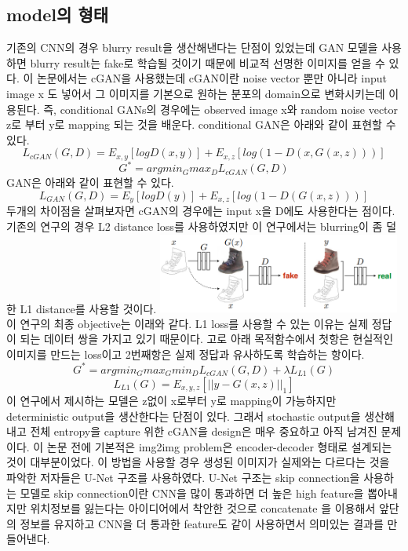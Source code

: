 \documentclass[extendedabs]{bmvc2k}
\begin{document}
 \subsection{model의 형태\cite{youtube}}
 \quad 기존의 CNN의 경우 blurry result을 생산해낸다는 단점이 있었는데 GAN 모델을 사용하면 blurry result는 fake로 학습될 것이기 때문에 비교적 선명한 이미지를 얻을 수 있다.  
 이 논문에서는 cGAN을 사용했는데 cGAN이란 noise vector 뿐만 아니라 input image x 도 넣어서 그 이미지를 기본으로 원하는 분포의 domain으로 변화시키는데 이용된다. 즉, 
 conditional GANs의 경우에는 observed image x와 random noise vector z로 부터 y로 mapping 되는 것을 배운다.
 conditional GAN은 아래와 같이 표현할 수 있다.
 $$ L_{cGAN}(G,D) = E_{x,y} [ log D(x,y) ] + E_{x,z} [log(1-D(x,G(x,z)))]$$
 $$G^* = argmin_G max_D L_{cGAN}(G,D) $$
 GAN은 아래와 같이 표현할 수 있다.
 $$ L_{GAN}(G,D) = E_y[log D(y)] + E_{x,z}[log(1-D(G(x,z)))]$$
 두개의 차이점을 살펴보자면 cGAN의 경우에는 input x을 D에도 사용한다는 점이다.
 기존의 연구의 경우 L2 distance loss를 사용하였지만 이 연구에서는 blurring이 좀 덜한 L1 distance를 사용할 것이다. 
 \newline  \includegraphics[width=8cm]{images/00_pix2pix.PNG}
 \newline 이 연구의 최종  objective는 이래와 같다. L1 loss를 사용할 수 있는 이유는 실제 정답이 되는 데이터 쌍을 가지고 있기 때문이다.
 고로 아래 목적함수에서 첫항은 현실적인 이미지를 만드는 loss이고 2번째항은 실제 정답과 유사하도록 학습하는 항이다.
 $$ G^{*} = argmin_G max_G min_D L_{cGAN}(G,D) + \lambda L_{L1}(G)$$
 $$ L_{L1}(G) = E_{x,y,z}[||y-G(x,z)||_1] $$
 이 연구에서 제시하는 모델은 z없이 x로부터 y로 mapping이 가능하지만 deterministic output을 생산한다는 단점이 있다.
 그래서 stochastic output을 생산해내고 전체 entropy을 capture 위한 cGAN을 design은 매우 중요하고 아직 남겨진 문제이다.
 이 논문 전에 기본적은 img2img problem은 encoder-decoder 형태로 설계되는 것이 대부분이었다. 이 방법을 사용할 경우 생성된 이미지가 
 실제와는 다르다는 것을 파악한 저자들은 U-Net 구조를 사용하였다. U-Net 구조는 skip connection을 사용하는 모델로 skip connection이란
 CNN을 많이 통과하면 더 높은 high feature을 뽑아내지만 위치정보를 잃는다는 아이디어에서 착안한 것으로 concatenate 을 이용해서 앞단의 정보를 유지하고
 CNN을 더 통과한 feature도 같이 사용하면서 의미있는 결과를 만들어낸다.
\end{document}
